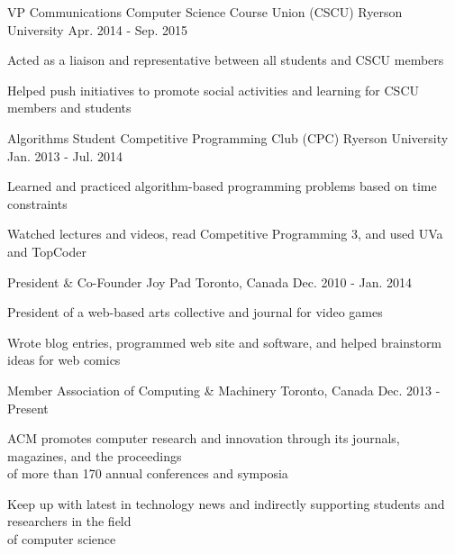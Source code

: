 \begin{cventries}
  \cventry
    {VP Communications}
    {Computer Science Course Union (CSCU)}
    {Ryerson University}
    {Apr. 2014 - Sep. 2015}
    {
      \begin{cvitems}
        \item {Acted as a liaison and representative between all students and CSCU members}
         \item {Helped push initiatives to promote social activities and learning for CSCU members and students}
      \end{cvitems}
      }
   \cventry
    {Algorithms Student}
    {Competitive Programming Club (CPC)}
    {Ryerson University}
    {Jan. 2013 - Jul. 2014}
    {
      \begin{cvitems}
        \item {Learned and practiced algorithm-based programming problems based on time constraints}
        \item {Watched lectures and videos, read Competitive Programming 3, and used UVa and TopCoder}
      \end{cvitems}
    }
   \cventry
    {President \& Co-Founder}
    {Joy Pad}
    {Toronto, Canada}
    {Dec. 2010 - Jan. 2014}
    {
      \begin{cvitems}
        \item {President of a web-based arts collective and journal for video games}
        \item {Wrote blog entries, programmed web site and software, and helped brainstorm ideas for web comics}
      \end{cvitems}
    }
    \cventry
    {Member}
    {Association of Computing \& Machinery}
    {Toronto, Canada}
    {Dec. 2013 - Present}
    {
      \begin{cvitems}
        \item {ACM promotes computer research and innovation through its journals, magazines, and the proceedings \\ of more than 170 annual conferences and symposia}
        \item {Keep up with latest in technology news and indirectly supporting students and researchers in the field \\ of computer science}
      \end{cvitems}
    }
\end{cventries}
